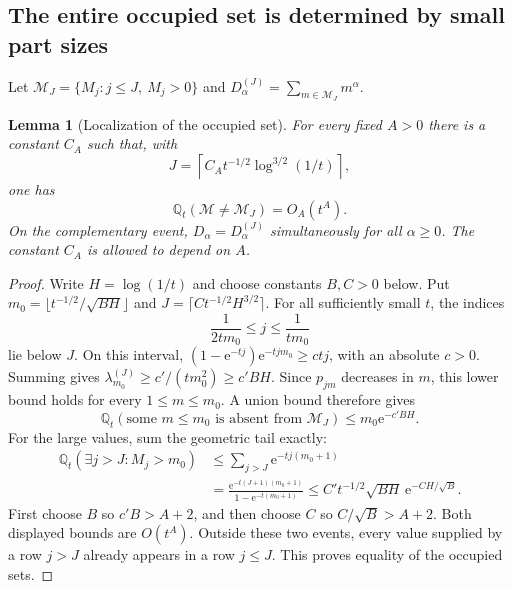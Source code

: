 \documentclass[11pt,letterpaper]{article}
\numberwithin{equation}{section}
\newtheorem{lemma}[theorem]{Lemma}
\theoremstyle{definition}\newtheorem{definition}[theorem]{Definition}
\theoremstyle{remark}\newtheorem{remark}[theorem]{Remark}
\newcommand{\ee}{\mathrm e}
\newcommand{\Q}{\mathbb Q}
\begin{document}
\subsection{The entire occupied set is determined by small part sizes}
Let $\mathcal M_J=\{M_j:j\le J,\ M_j>0\}$ and
$D_\alpha^{(J)}=\sum_{m\in\mathcal M_J}m^\alpha$.

\begin{lemma}[Localization of the occupied set]\label{dmv:fl:lem:localization}
For every fixed $A>0$ there is a constant $C_A$ such that, with
\begin{equation}\label{dmv:fl:eq:J}
 J=\left\lceil C_A t^{-1/2}\log^{3/2}(1/t)\right\rceil,
\end{equation}
one has
\begin{equation}\label{dmv:fl:eq:setlocalization}
 \Q_t(\mathcal M\ne\mathcal M_J)=O_A(t^A).
\end{equation}
On the complementary event, $D_\alpha=D_\alpha^{(J)}$ simultaneously for all
$\alpha\ge0$. The constant $C_A$ is allowed to depend on $A$.
\end{lemma}
\begin{proof}
Write $H=\log(1/t)$ and choose constants $B,C>0$ below. Put
$m_0=\lfloor t^{-1/2}/\sqrt{BH}\rfloor$ and
$J=\lceil Ct^{-1/2}H^{3/2}\rceil$.
For all sufficiently small $t$, the indices
\[
 \frac1{2tm_0}\le j\le\frac1{tm_0}
\]
lie below $J$. On this interval,
$(1-\ee^{-tj})\ee^{-tjm_0}\ge c tj$, with an absolute $c>0$.
Summing gives $\lambda_{m_0}^{(J)}\ge c'/(tm_0^2)\ge c'BH$.
Since $p_{jm}$ decreases in $m$, this lower bound holds for every
$1\le m\le m_0$. A union bound therefore gives
\begin{equation}\label{dmv:fl:eq:lowmiss}
 \Q_t(\text{some }m\le m_0\text{ is absent from }\mathcal M_J)
 \le m_0\ee^{-c'BH}.
\end{equation}
For the large values, sum the geometric tail exactly:
\begin{align}\label{dmv:fl:eq:highlate}
 \Q_t(\exists j>J:M_j>m_0)
 &\le\sum_{j>J}\ee^{-tj(m_0+1)}\\
 &=\frac{\ee^{-t(J+1)(m_0+1)}}{1-\ee^{-t(m_0+1)}}
 \le C' t^{-1/2}\sqrt{BH}\,\ee^{-CH/\sqrt B}.
 \nonumber
\end{align}
First choose $B$ so $c'B>A+2$, and then choose $C$ so
$C/\sqrt B>A+2$. Both displayed bounds are $O(t^A)$.
Outside these two events, every value supplied by a row $j>J$ already
appears in a row $j\le J$. This proves equality of the occupied sets.
\end{proof}
\end{document}
